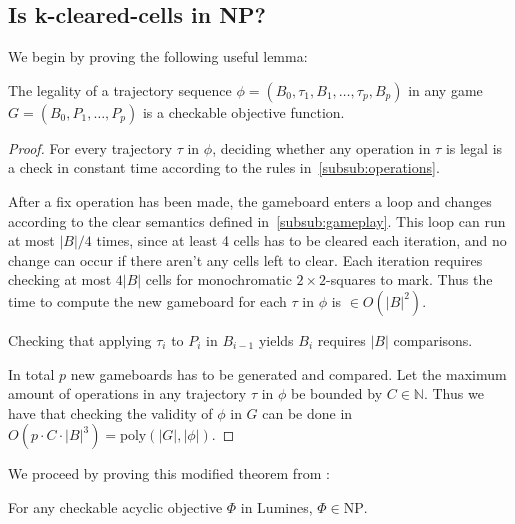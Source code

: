 \subsection{Is k-cleared-cells in NP?}

We begin by proving the following useful lemma:\\

\begin{lem}
\label{lem:legality}
The legality of a trajectory sequence $\phi=(B_0, \tau_1, B_1, \ldots ,\tau_p, B_p)$ in any game $G=(B_0, P_1, \ldots, P_p)$ is a checkable objective function.
\end{lem}

\begin{proof}
For every trajectory $\tau$ in $\phi$, deciding whether any operation in $\tau$ is legal is a check in constant time according to the rules in~\ref{subsub:operations}.

After a fix operation has been made, the gameboard enters a loop and changes according to the clear semantics defined in~\ref{subsub:gameplay}. This loop can run at most $|B| / 4$ times, since at least 4 cells has to be cleared each iteration, and no change can occur if there aren't any cells left to clear. Each iteration requires checking at most $4|B|$ cells for monochromatic $2 \times 2$-squares to mark. Thus the time to compute the new gameboard for each $\tau$ in $\phi$ is $\in O(|B|^2)$.

Checking that applying $\tau_i$ to $P_i$ in $B_{i-1}$ yields $B_i$ requires $|B|$ comparisons. 

In total $p$ new gameboards has to be generated and compared. Let the maximum amount of operations in any trajectory $\tau$ in $\phi$ be bounded by $C \in \mathbb{N}$. Thus we have that checking the validity of $\phi$ in $G$ can be done in $O(p \cdot C \cdot |B|^3) = \text{poly}(|G|, |\phi|)$. 
\end{proof}

We proceed by proving this modified theorem from \citeauthor{tetris} \cite{tetris}: \\

\begin{thm}
\label{thm:npobj}
For any checkable acyclic objective $\Phi$ in Lumines, $\Phi \in \text{NP}$.
\end{thm}

